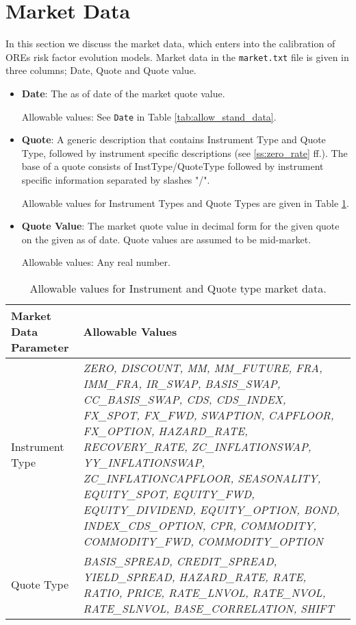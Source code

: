 \section{Market Data}\label{sec:market_data}
In this section we discuss the market data, which enters into the calibration of OREs risk factor evolution models. 
Market data in the {\tt market.txt} file is given in three columns; Date, Quote and Quote value.

\begin{itemize}
\item {\bf Date}: The as of date of the market quote value.

Allowable values:  See \lstinline!Date! in Table \ref{tab:allow_stand_data}.

\item {\bf Quote}: A generic description that contains Instrument Type
  and Quote Type, followed by instrument specific descriptions (see 
  \ref{ss:zero_rate} ff.). The base of a quote consists of
  InstType/QuoteType followed by instrument specific information
  separated by slashes "/".

  Allowable values for Instrument Types and Quote Types are given in Table \ref{tab:allow_market_data}.

\item {\bf Quote Value}: The market quote value in decimal form for
  the given quote on the given as of date. Quote values are assumed to
  be mid-market.

Allowable values: Any real number.
\end{itemize}

\begin{table}[H]
\centering
  \begin{tabular} {|l|p{5cm}|}
    \hline
    \bfseries{Market Data Parameter} & \bfseries{Allowable Values} \\
    \hline
 Instrument Type & \emph{ZERO, DISCOUNT, MM, MM\_FUTURE, FRA, IMM\_FRA,
  IR\_SWAP,  BASIS\_SWAP, CC\_BASIS\_SWAP, CDS, CDS\_INDEX, FX\_SPOT, FX\_FWD,
  SWAPTION, CAPFLOOR, FX\_OPTION, HAZARD\_RATE, RECOVERY\_RATE,
  ZC\_INFLATIONSWAP, YY\_INFLATIONSWAP, ZC\_INFLATIONCAPFLOOR,
  SEASONALITY, EQUITY\_SPOT, EQUITY\_FWD, EQUITY\_DIVIDEND, 
  EQUITY\_OPTION, BOND, INDEX\_CDS\_OPTION, CPR, COMMODITY, COMMODITY\_FWD, COMMODITY\_OPTION} \\
\hline
  Quote Type & \emph{BASIS\_SPREAD, CREDIT\_SPREAD, YIELD\_SPREAD, HAZARD\_RATE,
  RATE, RATIO, PRICE, RATE\_LNVOL, RATE\_NVOL, RATE\_SLNVOL,
  BASE\_CORRELATION, SHIFT} \\
\hline
  \end{tabular}
  \caption{Allowable values for Instrument and Quote type market data.}
  \label{tab:allow_market_data}
\end{table}

